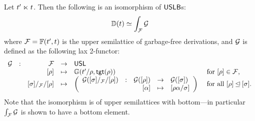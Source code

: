 \begin{theorem}
Let $t' \mathrel{\ltimes} t$. Then the following is an isomorphism of $\mathsf{USLB}$s:
\begin{equation}
  \leqn{factorization_ulb_derivations:isomorphism}
  \ulbDeriv{\tm} \simeq \grothy{ \ulbF }{ \ulbG }
\end{equation}
where $\mathcal{F} = \mathbb{F}(t', t)$
is the upper semilattice of garbage-free derivations,
and $\mathcal{G}$ is defined as the following lax 2-functor:
\[
 \begin{array}{rrrcll}
   \mathcal{G} & : & \mathcal{F} & \to & \mathsf{USL} \\
               &   & {[\rho]}                  & \mapsto & \mathbb{G}(t'/\rho, \mathsf{tgt}(\rho)) & \text{ for ${[\rho]} \in \mathcal{F}$,} \\
               &   & {[\sigma]}/_{\mathcal{F}}/{[\rho]} & \mapsto &
                     \left(\begin{array}{rrrcl}
                       \mathcal{G}({[\sigma]}/_{\mathcal{F}}/{[\rho]}) & : & \mathcal{G}({[\rho]}) & \to & \mathcal{G}({[\sigma]}) \\
                                                                   &   & [\alpha] & \mapsto & [\rho\alpha/\sigma] \\
                     \end{array}\right)
                     & \text{ for all ${[\rho]} \unlhd {[\sigma]}$.} \\
 \end{array}
\]
Note that the isomorphism 
is of upper semilattices with bottom---in particular $\int_{\mathcal{F}}{\mathcal{G}}$ is shown to have a bottom element.
\end{theorem}
